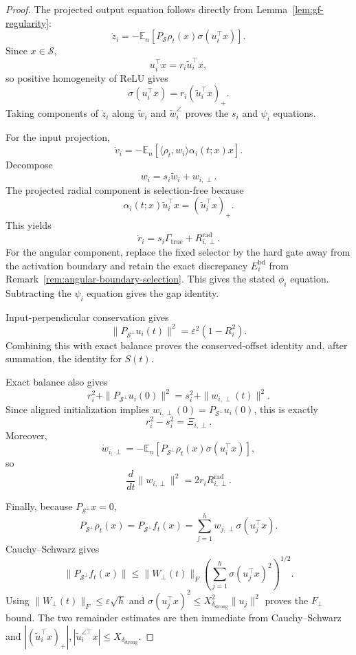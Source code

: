 \documentclass{article} %
\theoremstyle{plain}
\theoremstyle{definition}
\theoremstyle{remark}
\begin{document}
\begin{proof}
The projected output equation follows directly from
Lemma~\ref{lem:gf-regularity}:
\[
\dot z_i
=
-\mathbb E_n
\left[
P_{\mathcal S}\rho_t(x)
\sigma(u_i^\top x)
\right].
\]
Since $x\in\mathcal S$,
\[
u_i^\top x
=
r_i\widetilde u_i^\top x,
\]
so positive homogeneity of ReLU gives
\[
\sigma(u_i^\top x)
=
r_i(\widetilde u_i^\top x)_+.
\]
Taking components of $\dot z_i$ along
$\widetilde w_i$ and $\widetilde w_i^\angle$ proves the $s_i$ and $\psi_i$
equations.

For the input projection,
\[
\dot v_i
=
-\mathbb E_n
\left[
\langle\rho_t,w_i\rangle
\alpha_i(t;x)x
\right].
\]
Decompose
\[
w_i=s_i\widetilde w_i+w_{i,\perp}.
\]
The projected radial component is selection-free because
\[
\alpha_i(t;x)\widetilde u_i^\top x
=
(\widetilde u_i^\top x)_+.
\]
This yields
\[
\dot r_i
=
s_i\Gamma_{\mathrm{true}}
+
R_{i,\perp}^{\mathrm{rad}}.
\]
For the angular component, replace the fixed selector by the hard gate away
from the activation boundary and retain the exact discrepancy
$E_i^{\mathrm{bd}}$ from
Remark~\ref{rem:angular-boundary-selection}.  This gives the stated
$\phi_i$ equation.  Subtracting the $\psi_i$ equation gives the gap identity.

Input-perpendicular conservation gives
\[
\|P_{\mathcal S^\perp}u_i(t)\|^2
=
\varepsilon^2(1-R_i^2).
\]
Combining this with exact balance proves the conserved-offset identity and,
after summation, the identity for $S(t)$.

Exact balance also gives
\[
r_i^2+\|P_{\mathcal S^\perp}u_i(0)\|^2
=
s_i^2+\|w_{i,\perp}(t)\|^2.
\]
Since aligned initialization implies
$w_{i,\perp}(0)=P_{\mathcal S^\perp}u_i(0)$, this is exactly
\[
r_i^2-s_i^2=\Xi_{i,\perp}.
\]
Moreover,
\[
\dot w_{i,\perp}
=
-\mathbb E_n
\left[
P_{\mathcal S^\perp}\rho_t(x)
\sigma(u_i^\top x)
\right],
\]
so
\[
\frac{d}{dt}\|w_{i,\perp}\|^2
=
2r_iR_{i,\perp}^{\mathrm{rad}}.
\]

Finally, because $P_{\mathcal S^\perp}x=0$,
\[
P_{\mathcal S^\perp}\rho_t(x)
=
P_{\mathcal S^\perp}f_t(x)
=
\sum_{j=1}^h
w_{j,\perp}\sigma(u_j^\top x).
\]
Cauchy--Schwarz gives
\[
\|P_{\mathcal S^\perp}f_t(x)\|
\le
\|W_\perp(t)\|_F
\left(
\sum_{j=1}^h\sigma(u_j^\top x)^2
\right)^{1/2}.
\]
Using
$\|W_\perp(t)\|_F\le\varepsilon\sqrt h$ and
$\sigma(u_j^\top x)^2\le X_{\delta_{\mathrm{strong}}}^2\|u_j\|^2$
proves the $F_\perp$ bound.  The two remainder estimates are then immediate
from Cauchy--Schwarz and
$|(\widetilde u_i^\top x)_+|,
|\widetilde u_i^{\angle\top}x|
\le X_{\delta_{\mathrm{strong}}}$.
\end{proof}
\end{document}
